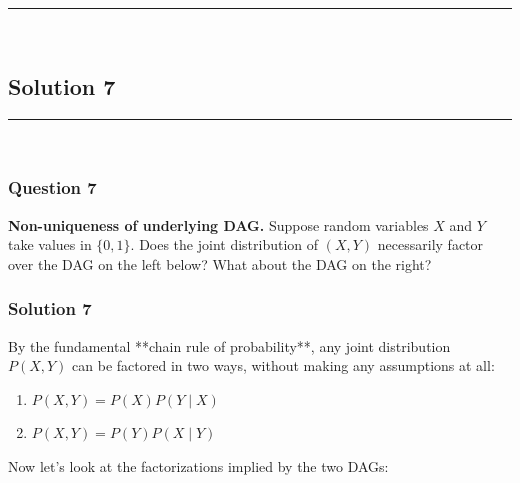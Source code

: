 \documentclass{article}
\begin{document}
\noindent\rule{\textwidth}{0.4pt}\\

\newpage
\subsection*{Solution 7}
\noindent\rule{\textwidth}{0.4pt}\\
\subsubsection*{Question 7}
\begin{flushleft}
    \textbf{Non-uniqueness of underlying DAG.} Suppose random variables $X$ and $Y$ take values in $\{0,1\}$. 
    Does the joint distribution of $(X, Y)$ necessarily factor over the DAG on the left below? 
    What about the DAG on the right? 

    \begin{center}
    \end{center}
\end{flushleft}

\subsubsection*{Solution 7}
By the fundamental **chain rule of probability**, any joint distribution $P(X, Y)$ can be factored in two ways, without making any assumptions at all:
\begin{enumerate}
    \item $P(X, Y) = P(X) P(Y \mid X)$
    \item $P(X, Y) = P(Y) P(X \mid Y)$
\end{enumerate}
Now let's look at the factorizations implied by the two DAGs:
\end{document}
